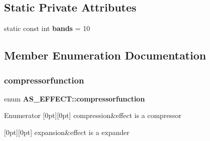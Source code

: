 \subsection*{Static Private Attributes}
\begin{DoxyCompactItemize}
\item 
static const int \textbf{ bands} = 10
\end{DoxyCompactItemize}


\subsection{Member Enumeration Documentation}
\mbox{\label{class_a_s___e_f_f_e_c_t_a4ed78e44d982bb949709a87c60f22ea2}} 
\subsubsection{compressorfunction}
{\footnotesize\ttfamily enum \textbf{ A\+S\+\_\+\+E\+F\+F\+E\+C\+T\+::compressorfunction}\hspace{0.3cm}{\ttfamily [private]}}

\begin{DoxyEnumFields}{Enumerator}
[0pt][0pt]{}\mbox{\label{class_a_s___e_f_f_e_c_t_a4ed78e44d982bb949709a87c60f22ea2a83d5b0ccb77107a971947db8ce0a0c9f}} 
compression&effect is a compressor \\
\hline

[0pt][0pt]{}\mbox{\label{class_a_s___e_f_f_e_c_t_a4ed78e44d982bb949709a87c60f22ea2a89d2cfb164d90b3d8c97abe756d37e22}} 
expansion&effect is a expander \\
\hline

\end{DoxyEnumFields}
\mbox{\label{class_a_s___e_f_f_e_c_t_a3c75445cc4db5c365d186af35c38c96a}} 
